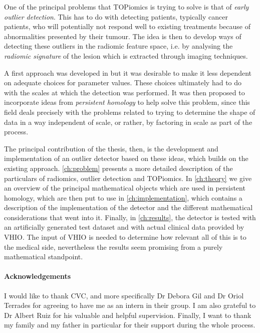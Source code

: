 \documentclass[12pt, oneside]{book}
\begin{document}
One of the principal problems that TOPiomics is trying to solve is that of \emph{early outlier
detection}. This has to do with detecting patients, typically cancer patients, who will
potentially not respond well to existing treatments because of abnormalities presented by
their tumour. The idea is then to develop ways of detecting these outliers in the radiomic
feature space, i.e. by analysing the \emph{radiomic signature} of the lesion which is
extracted through imaging techniques.

A first approach was developed in \cite{topiomics} but it was desirable to make it less
dependent on adequate choices for parameter values. These choices ultimately had to do
with the scales at which the detection was performed. It was then proposed to incorporate
ideas from \emph{persistent homology} to help solve this problem, since this field
deals precisely with the problems related to trying to determine the shape of data in a
way independent of scale, or rather, by factoring in scale as part of the process. 

The principal contribution of the thesis, then, is the development and implementation of
an outlier detector based on these ideas, which builds on the existing approach.
\cref{ch:problem} presents a more detailed description of the particulars of radiomics,
outlier detection and TOPiomics. In \cref{ch:theory} we give an overview of the principal
mathematical objects which are used in persistent homology, which are then put to use in
\cref{ch:implementation}, which contains a description of the implementation of the
detector and the different mathematical considerations that went into it. Finally, in
\cref{ch:results}, the detector is tested with an artificially generated test dataset and with actual
clinical data provided by VHIO. The input of VHIO is needed to determine how relevant all
of this is to the medical side, nevertheless the results seem promising from a purely
mathematical standpoint.  

\paragraph{Acknowledgements}
I would like to thank CVC, and more specifically Dr Debora Gil and Dr Oriol Terrades for
agreeing to have me as an intern in their group. I am also grateful to Dr Albert Ruiz
for his valuable and helpful supervision. Finally, I want to thank my family and my father
in particular for their support during the whole process. 

\mainmatter
\pagestyle{main}
\end{document}
